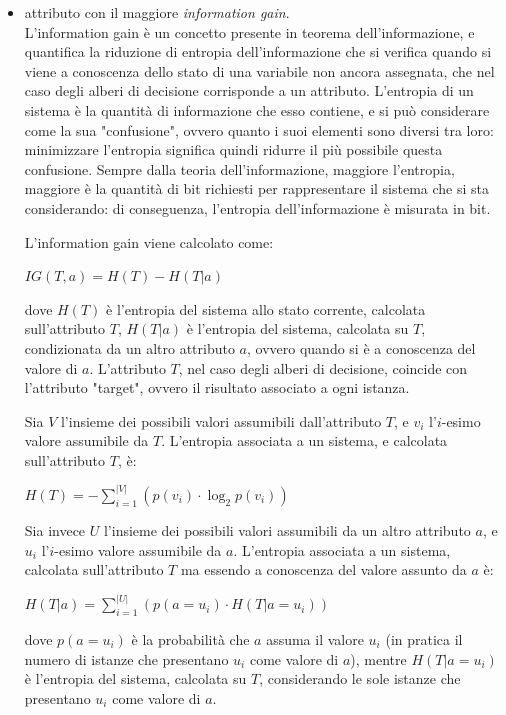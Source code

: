 \begin{itemize}
    \item attributo con il maggiore \textit{information gain}.\\
    L'information gain è un concetto presente in teorema dell'informazione, e quantifica la riduzione di entropia dell'informazione che si verifica quando si viene a conoscenza dello stato di una variabile non ancora assegnata, che nel caso degli alberi di decisione corrisponde a un attributo.
    L'entropia di un sistema è la quantità di informazione che esso contiene, e si può considerare come la sua "confusione", ovvero quanto i suoi elementi sono diversi tra loro: minimizzare l'entropia significa quindi ridurre il più possibile questa confusione.
    Sempre dalla teoria dell'informazione, maggiore l'entropia, maggiore è la quantità di bit richiesti per rappresentare il sistema che si sta considerando: di conseguenza, l'entropia dell'informazione è misurata in bit.
    
    L'information gain viene calcolato come:
    \begin{center}
        $IG(T, a) = H(T) - H(T | a)$
    \end{center}
    dove $H(T)$ è l'entropia del sistema allo stato corrente, calcolata sull'attributo $T$, $H(T | a)$ è l'entropia del sistema, calcolata su $T$, condizionata da un altro attributo $a$, ovvero quando si è a conoscenza del valore di $a$.
    L'attributo $T$, nel caso degli alberi di decisione, coincide con l'attributo "target", ovvero il risultato associato a ogni istanza.
    
    Sia $V$ l'insieme dei possibili valori assumibili dall'attributo $T$, e $v_i$ l'$i$-esimo valore assumibile da $T$. L'entropia associata a un sistema, e calcolata sull'attributo $T$, è:
    \begin{center}
        $H(T) = -\sum\limits_{i = 1}^{|V|} \left( p(v_i) \cdot \log_2 p(v_i) \right) $
    \end{center}
    Sia invece $U$ l'insieme dei possibili valori assumibili da un altro attributo $a$, e $u_i$ l'$i$-esimo valore assumibile da $a$.
    L'entropia associata a un sistema, calcolata sull'attributo $T$ ma essendo a conoscenza del valore assunto da $a$ è:
    \begin{center}
        $H(T | a) = \sum\limits_{i = 1}^{|U|} \left( p(a = u_i) \cdot H(T | a=u_i) \right) $
    \end{center}
    dove $p(a = u_i)$ è la probabilità che $a$ assuma il valore $u_i$ (in pratica il numero di istanze che presentano $u_i$ come valore di $a$), mentre $H(T | a = u_i)$ è l'entropia del sistema, calcolata su $T$, considerando le sole istanze che presentano $u_i$ come valore di $a$.
    

\end{itemize}
